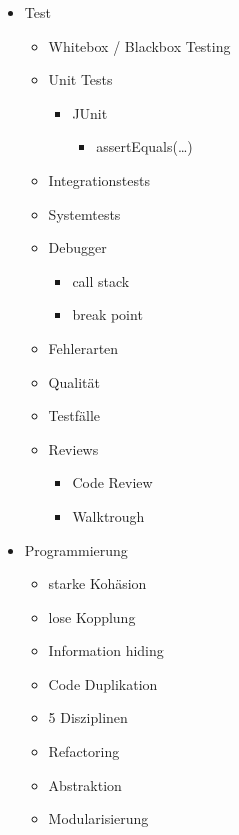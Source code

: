 \begin{itemize}
    \item Test
    \begin{itemize}
        \item Whitebox / Blackbox Testing
        \item Unit Tests
        \begin{itemize}
            \item JUnit
            \begin{itemize}
                \item assertEquals(\dots)
            \end{itemize}
        \end{itemize}
        \item Integrationstests
        \item Systemtests
        \item Debugger
        \begin{itemize}
            \item call stack
            \item break point
        \end{itemize}
        \item Fehlerarten
        \item Qualität
        \item Testfälle
        \item Reviews
        \begin{itemize}
            \item Code Review
            \item Walktrough
        \end{itemize}
    \end{itemize}
    
    \item Programmierung
    \begin{itemize}
        \item starke Kohäsion
        \item lose Kopplung
        \item Information hiding
        \item Code Duplikation
        \item 5 Disziplinen
        \item Refactoring
        \item Abstraktion
        \item Modularisierung
    \end{itemize}
    

\end{itemize}
